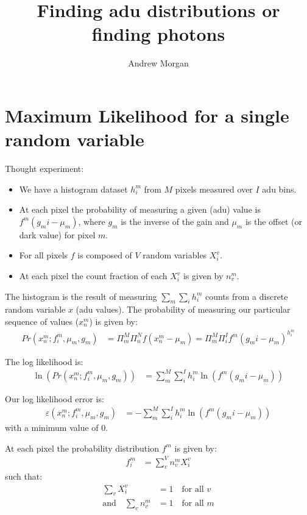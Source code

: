 \documentclass[11pt]{article}
\title{\textbf{Finding adu distributions or finding photons}}
\author{Andrew Morgan}
\date{}
\begin{document}
\maketitle

\section{Maximum Likelihood for a single random variable}
Thought experiment:

\begin{itemize}

  \item We have a histogram dataset $h^m_i$ from $M$ pixels measured over $I$ adu bins.
  \item At each pixel the probability of measuring a given (adu) value is $f^m(g_m i - \mu_m)$, where $g_m$ is the inverse of the gain and $\mu_m$ is the offset (or dark value) for pixel $m$. 
  \item For all pixels $f$ is composed of $V$ random variables $X^v_i$.
  \item At each pixel the count fraction of each $X^v_i$ is given by $n^m_v$.
\end{itemize}

The histogram is the result of measuring $\sum_m \sum_i h^m_i$ counts from a discrete random variable $x$ (adu values).
The probability of measuring our particular sequence of values ($ x^m_n $) is given by:
\begin{align}
   Pr(x^m_n; f^m_i, \mu_m, g_m) &= \Pi_m^M \Pi_n^N f(x^m_n - \mu_m) = \Pi_m^M \Pi_i^I f^m(g_m i - \mu_m)^{h^m_i}
\end{align}

The log likelihood is:
\begin{align}
   \ln(Pr(x^m_n; f^m_i, \mu_m, g_m)) &= \sum_m^M \sum_i^I h^m_i \ln(f^m(g_m i - \mu_m))
\end{align}

Our log likelihood error is:
\begin{align}
   \varepsilon(x^m_n; f^m_i, \mu_m, g_m) &= -\sum_m^M \sum_i^I h^m_i \ln(f^m(g_m i - \mu_m))
\end{align}
with a minimum value of 0. 

At each pixel the probability distribution $f^m$ is given by:
\begin{align}
   f^m_i &= \sum_v^V n^m_v X^v_i 
\end{align}
such that:
\begin{align}
   \sum_v X^v_i &= 1 \quad \text{for all } v \\
   \text{and} \quad \sum_v n^m_v &= 1  \quad \text{for all } m 
\end{align}
\end{document}
